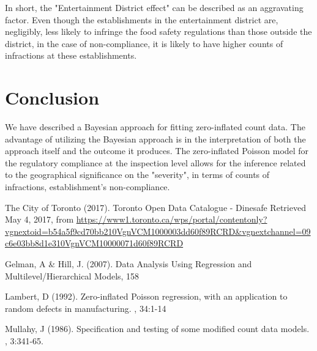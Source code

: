 \documentclass[twoside,onecolumn]{article}
\begin{document}
In short, the "Entertainment District effect" can be described as an aggravating factor. Even though the establishments in the entertainment district are, negligibly, less likely to infringe the food safety regulations than those outside the district, in the case of non-compliance, it is likely to have higher counts of infractions at these establishments.




\section{Conclusion}
We have described a Bayesian approach for fitting zero-inflated count data. The advantage of utilizing the Bayesian approach is in the interpretation of both the approach itself and the outcome it produces.  The zero-inflated Poisson model for the regulatory compliance at the inspection level allows for the inference related to the geographical significance on the "severity", in terms of counts of infractions, establishment's non-compliance. 


\begin{thebibliography}{99} %
The City of Toronto (2017).
\newblock Toronto Open Data Catalogue - Dinesafe
\newblock Retrieved May 4, 2017, from \url{https://www1.toronto.ca/wps/portal/contentonly?vgnextoid=b54a5f9cd70bb210VgnVCM1000003dd60f89RCRD&vgnextchannel=09c6e03bb8d1e310VgnVCM10000071d60f89RCRD}

Gelman, A \& Hill, J. (2007).
\newblock Data Analysis Using Regression and Multilevel/Hierarchical Models, 158

Lambert, D (1992).
\newblock Zero-inflated Poisson regression, with an application to
random defects in manufacturing. 
, 34:1-14

Mullahy, J (1986).
\newblock Specification and testing of some modified count data models. 
, 3:341-65.
 
\end{thebibliography}
\end{document}
